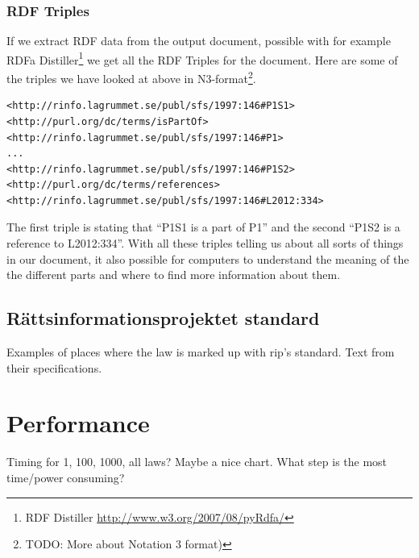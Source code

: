 \subsubsection{RDF Triples}
If we extract RDF data from the output document, possible with for example RDFa Distiller\footnote{RDF Distiller \url{http://www.w3.org/2007/08/pyRdfa/}} we get all the RDF Triples for the document. Here are some of the triples we have looked at above in N3-format\footnote{TODO: More about Notation 3 format)}.\\
\begin{verbatim}
<http://rinfo.lagrummet.se/publ/sfs/1997:146#P1S1> 
<http://purl.org/dc/terms/isPartOf>
<http://rinfo.lagrummet.se/publ/sfs/1997:146#P1>
...
<http://rinfo.lagrummet.se/publ/sfs/1997:146#P1S2>
<http://purl.org/dc/terms/references>
<http://rinfo.lagrummet.se/publ/sfs/1997:146#L2012:334>
\end{verbatim}
\linebreak
\newline
The first triple is stating that “P1S1 is a part of P1” and the second “P1S2 is a reference to L2012:334”. With all these triples telling us about all sorts of things in our document, it also possible for computers to understand the meaning of the the different parts and where to find more information about them.

\subsection{Rättsinformationsprojektet standard}
Examples of places where the law is marked up with rip's standard. 
Text from their specifications.

\section{Performance}
Timing for 1, 100, 1000, all laws? Maybe a nice chart. 
What step is the most time/power consuming?

